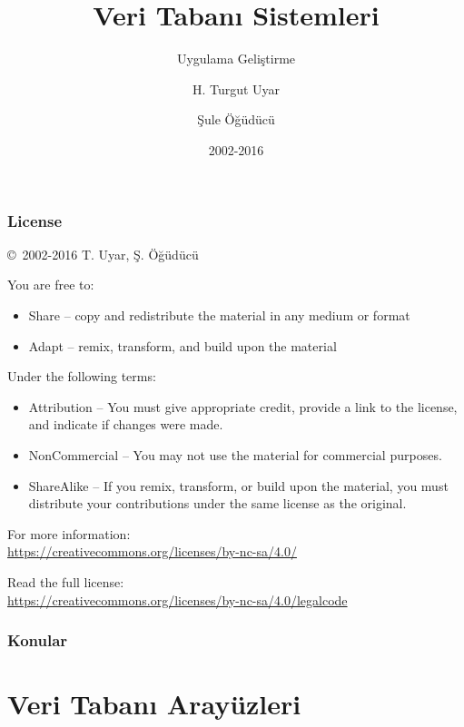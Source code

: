 \documentclass[dvipsnames]{beamer}
\title{Veri Tabanı Sistemleri}
\subtitle{Uygulama Geliştirme}
\author{H. Turgut Uyar \and Şule Öğüdücü}
\date{2002-2016}
\theoremstyle{plain}
\begin{document}
\begin{frame}
  \titlepage
\end{frame}

\begin{frame}
  \frametitle{License}

  \hfill
  \copyright~2002-2016 T. Uyar, Ş. Öğüdücü

  \vfill
  \begin{footnotesize}
    You are free to:
    \begin{itemize}
      \itemsep0em
      \item Share -- copy and redistribute the material in any medium or format
      \item Adapt -- remix, transform, and build upon the material
    \end{itemize}

    Under the following terms:
    \begin{itemize}
      \itemsep0em
      \item Attribution -- You must give appropriate credit, provide a link to
        the license, and indicate if changes were made.

      \item NonCommercial -- You may not use the material for commercial
        purposes.

      \item ShareAlike -- If you remix, transform, or build upon the material,
        you must distribute your contributions under the same license as the
        original.
    \end{itemize}
  \end{footnotesize}

  \begin{small}
    For more information:\\
    \url{https://creativecommons.org/licenses/by-nc-sa/4.0/}

    \smallskip
    Read the full license:\\
    \url{https://creativecommons.org/licenses/by-nc-sa/4.0/legalcode}
  \end{small}
\end{frame}

\begin{frame}
  \frametitle{Konular}
  \tableofcontents
\end{frame}

\lstset{language=Python3}

\section{Veri Tabanı Arayüzleri}
\end{document}
